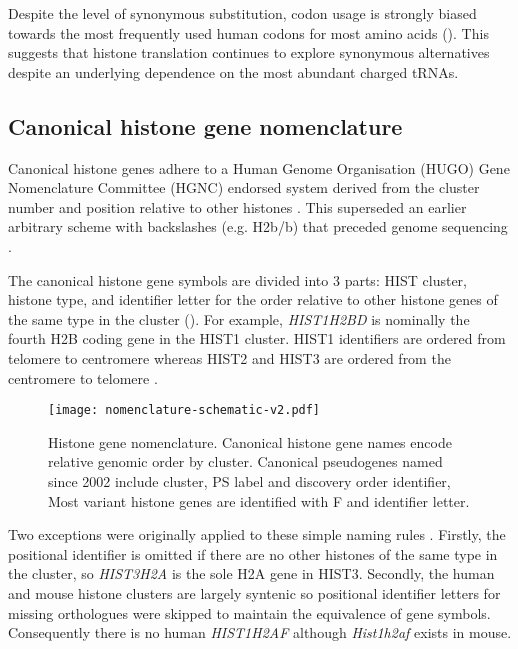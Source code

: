     Despite the level of synonymous substitution,
    codon usage is strongly biased towards the most frequently used human codons for most amino acids ().
    This suggests that histone translation continues to explore synonymous alternatives
    despite an underlying dependence on the most abundant charged tRNAs.

  \subsection{Canonical histone gene nomenclature}
    Canonical histone genes adhere to a Human Genome Organisation (HUGO) Gene Nomenclature Committee (HGNC)
    endorsed system derived from the cluster number and position relative to other histones \citep{Marzluff02}.
    This superseded an earlier arbitrary scheme with backslashes (e.g. H2b/b)
    that preceded genome sequencing \citep{AlbigGenomics1997,AlbigHumangen1997}.

    The canonical histone gene symbols are divided into 3 parts:
    HIST cluster, histone type, and identifier letter
    for the order relative to other histone genes of the same type in the cluster ().
    For example, \textit{HIST1H2BD} is nominally the fourth H2B coding gene in the HIST1 cluster.
    HIST1 identifiers are ordered from telomere to centromere
    whereas HIST2 and HIST3 are ordered from the centromere to telomere \citep{Marzluff02}.

    \begin{figure*}
      \centering
      \texttt{[image: nomenclature-schematic-v2.pdf]}
      \caption{Histone gene nomenclature.
               Canonical histone gene names encode relative genomic order by cluster.
               Canonical pseudogenes named since 2002 include cluster, PS label and discovery order identifier,
               Most variant histone genes are identified with F and identifier letter.}
      \label{fig:nomenclature}
    \end{figure*}

    Two exceptions were originally applied to these simple naming rules \citep{Marzluff02}.
    Firstly, the positional identifier is omitted if there are no other histones of the same type in the cluster,
    so \textit{HIST3H2A} is the sole H2A gene in HIST3.
    Secondly, the human and mouse histone clusters are largely syntenic
    so positional identifier letters for missing orthologues were skipped to maintain the equivalence of gene symbols.
    Consequently there is no human \textit{HIST1H2AF} although \textit{Hist1h2af} exists in mouse.


